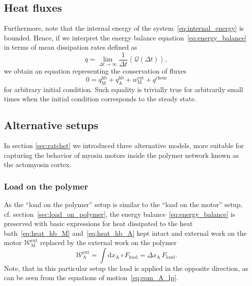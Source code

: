 \documentclass[aps,pre,twocolumn,showpacs,showkeys,superscriptaddress,floatfix]{revtex4-1}
\newcommand{\rmd}{{\mathrm d}}
\begin{document}
\subsection{Heat fluxes}
\label{sec:heat_flux}
Furthermore, note that the internal energy of the system~\eqref{eq:internal_energy} is bounded.
Hence, if we interpret the energy balance equation~\eqref{eq:energy_balance} in terms of mean dissipation rates defined as 
\begin{equation}
q = \lim_{\Delta t \to \infty} \frac{1}{\Delta t} \left\langle {\mathcal Q}(\Delta t) \right\rangle ,
\label{eq:heat_flux}
\end{equation}
we obtain an equation representing the conservation of fluxes 
\begin{equation}
0 = q_\text{M}^\text{hb} + q_\text{A}^\text{hb} + w^\text{ext}_\text{M} + q^\text{chem} 
\label{eq:heat_flux_balance}
\end{equation}
for arbitrary initial condition. 
Such equality is trivially true for arbitrarily small times when the initial condition corresponds to the steady state.


\subsection{Alternative setups} 
In section \ref{sec:ratchet} we introduced three alternative models, 
more suitable for capturing the behavior of myosin motors inside the polymer network known as the actomyosin cortex.

\subsubsection{Load on the polymer}
As the ``load on the polymer'' setup is similar to the ``load on the motor'' setup, cf. section~\ref{sec:load_on_polymer}, 
the energy balance~\eqref{eq:energy_balance} is preserved 
with basic expressions for heat dissipated to the heat bath~\eqref{eq:heat_hb_M} and~\eqref{eq:heat_hb_A} kept intact 
and external work on the motor ${\mathcal W}_\text{M}^\text{ext}$ replaced by the external work on the polymer
\[
{\mathcal W}_\text{A}^\text{ext} = \int \rmd x_\text{A} \circ F_\text{load} = \Delta x_\text{A} \, F_\text{load} . 
\]
Note, that in this particular setup the load is applied in the opposite direction, as can be seen from the equations of motion~\eqref{eq:eom_A_lp}. 
\end{document}
